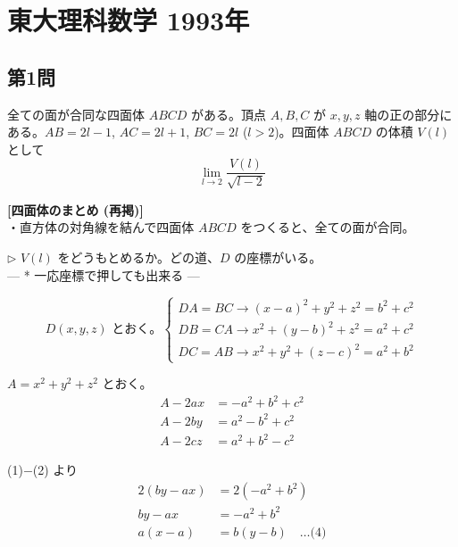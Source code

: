 \documentclass[../main.tex]{subfiles}
\begin{document}
\section*{東大理科数学 1993年}

\subsection*{第1問}

\begin{center}
  \begin{framed}
    全ての面が合同な四面体 $ABCD$ がある。頂点 $A,B,C$ が $x,y,z$ 軸の正の部分にある。$AB=2l-1$, $AC=2l+1$, $BC=2l$ ($l>2$)。四面体 $ABCD$ の体積 $V(l)$ として
    \[
      \lim_{l \to 2} \frac{V(l)}{\sqrt{l-2}}
    \]
  \end{framed}
\end{center}

\noindent
\begin{framed}
  \textbf{[四面体のまとめ (再掲)]}\\
  ・直方体の対角線を結んで四面体 $ABCD$ をつくると、全ての面が合同。
\end{framed}

\noindent
$\triangleright$ $V(l)$ をどうもとめるか。どの道、$D$ の座標がいる。\\
--- * 一応座標で押しても出来る ---

\begin{equation*}
  D(x,y,z) \text{ とおく。}
  \begin{cases}
    DA = BC \to (x-a)^2 + y^2 + z^2 = b^2 + c^2 \\
    DB = CA \to x^2 + (y-b)^2 + z^2 = a^2 + c^2 \\
    DC = AB \to x^2 + y^2 + (z-c)^2 = a^2 + b^2
  \end{cases}
\end{equation*}

$A = x^2 + y^2 + z^2$ とおく。
\begin{align}
  A - 2ax &= -a^2 + b^2 + c^2 \\
  A - 2by &= a^2 - b^2 + c^2 \\
  A - 2cz &= a^2 + b^2 - c^2
\end{align}

(1)$-$(2) より
\begin{align*}
  2(by - ax) &= 2(-a^2 + b^2) \\
  by - ax &= -a^2 + b^2 \\
  a(x-a) &= b(y-b) \quad \dots \text{(4)}
\end{align*}
\end{document}
